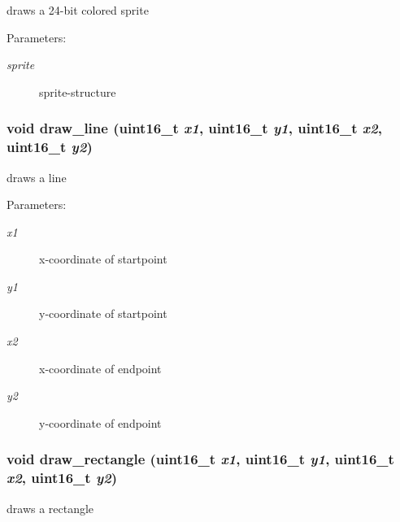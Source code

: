 draws a 24-bit colored sprite 

\begin{Desc}
\item[Parameters:]
\begin{description}
\item[{\em sprite}]sprite-structure \end{description}
\end{Desc}
\hypertarget{group__hgdi__api_gd0d0faa6493f00905dc998f5b8833d46}{
\subsubsection[{draw\_\-line}]{\setlength{\rightskip}{0pt plus 5cm}void draw\_\-line (uint16\_\-t {\em x1}, \/  uint16\_\-t {\em y1}, \/  uint16\_\-t {\em x2}, \/  uint16\_\-t {\em y2})}}
\label{group__hgdi__api_gd0d0faa6493f00905dc998f5b8833d46}


draws a line 

\begin{Desc}
\item[Parameters:]
\begin{description}
\item[{\em x1}]x-coordinate of startpoint \item[{\em y1}]y-coordinate of startpoint \item[{\em x2}]x-coordinate of endpoint \item[{\em y2}]y-coordinate of endpoint \end{description}
\end{Desc}
\hypertarget{group__hgdi__api_gfa36c7551052447e34f346143af702db}{
\subsubsection[{draw\_\-rectangle}]{\setlength{\rightskip}{0pt plus 5cm}void draw\_\-rectangle (uint16\_\-t {\em x1}, \/  uint16\_\-t {\em y1}, \/  uint16\_\-t {\em x2}, \/  uint16\_\-t {\em y2})}}
\label{group__hgdi__api_gfa36c7551052447e34f346143af702db}


draws a rectangle 

